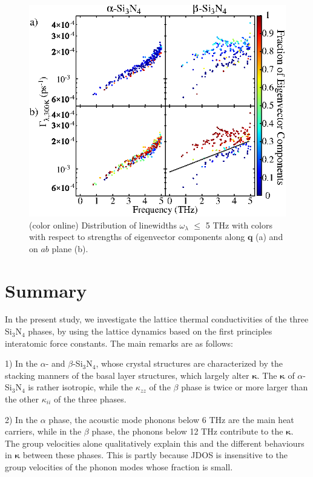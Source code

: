 \documentclass[twocolumn,amsmath,amssymb,a4paper,prb,superscriptaddress,floatfix]{revtex4-1}
\begin{document}
\begin{figure}[ht]
 \centering
  \includegraphics[width=\linewidth]{figure_analyze_gamma3_m1010_print.eps} \caption{(color
	  online) Distribution of linewidths $\omega_\lambda$ $\leq$ 5 THz
		  with colors with respect to strengths of eigenvector components along $\mathbf q$ (a)
		  and on $ab$ plane (b).} \label{fig:Fig7_338} 
 \centering
\end{figure}

\section{Summary}

In the present study, we investigate the lattice thermal conductivities of the
three Si$_3$N$_4$ phases, by using the lattice dynamics based on the first
principles interatomic force constants. The main remarks are as follows:

1) In the $\alpha$- and $\beta$-Si$_3$N$_4$, whose crystal structures are
characterized by the stacking manners of the basal layer structures, which
largely alter $\boldsymbol{\kappa}$. The $\boldsymbol{\kappa}$ of
$\alpha$-Si$_3$N$_4$ is rather isotropic, while the $\kappa$$_{zz}$ of the
$\beta$ phase is twice or more larger than the other $\kappa_{ii}$ of the three
phases.

2) In the $\alpha$ phase, the acoustic mode phonons below 6 THz are the main
heat carriers, while in the $\beta$ phase, the phonons below 12 THz contribute
to the $\boldsymbol{\kappa}$. The group velocities alone qualitatively explain
this and the different behaviours in $\boldsymbol{\kappa}$ between these phases.
This is partly because JDOS is insensitive to the group velocities of the phonon
modes whose fraction is small.
\end{document}
